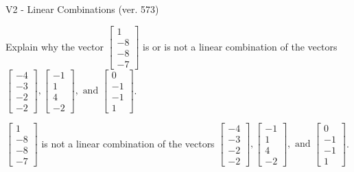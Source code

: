 \begin{exercise}
  \begin{exerciseTitle}V2 - Linear Combinations (ver. 573)\end{exerciseTitle}
  \begin{exerciseStatement}
    Explain why the vector \(\left[\begin{array}{c}
1 \\
-8 \\
-8 \\
-7
\end{array}\right]\)  is or is not a linear 
	combination of the vectors \(\left[\begin{array}{c}
-4 \\
-3 \\
-2 \\
-2
\end{array}\right] , \left[\begin{array}{c}
-1 \\
1 \\
4 \\
-2
\end{array}\right] , \text{ and } \left[\begin{array}{c}
0 \\
-1 \\
-1 \\
1
\end{array}\right]\).
	


  \end{exerciseStatement}
  \begin{exerciseAnswer}
   \(\left[\begin{array}{c}
1 \\
-8 \\
-8 \\
-7
\end{array}\right]\) 
  	 is not  
	a linear combination of the vectors \(\left[\begin{array}{c}
-4 \\
-3 \\
-2 \\
-2
\end{array}\right] , \left[\begin{array}{c}
-1 \\
1 \\
4 \\
-2
\end{array}\right] , \text{ and } \left[\begin{array}{c}
0 \\
-1 \\
-1 \\
1
\end{array}\right]\).

	
  


  \end{exerciseAnswer}
\end{exercise}
